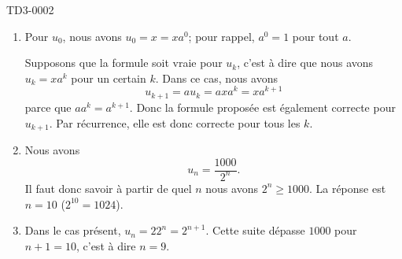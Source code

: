 
\begin{corrige}{TD3-0002}

	\begin{enumerate}
		\item
			Pour $u_0$, nous avons $u_0=x=xa^0$; pour rappel, $a^0=1$ pour tout $a$.

			Supposons que la formule soit vraie pour $u_k$, c'est à dire que nous avons $u_k=xa^k$ pour un certain $k$. Dans ce cas, nous avons
			\begin{equation}
				u_{k+1}=au_{k}=axa^k=xa^{k+1}
			\end{equation}
			parce que $aa^k=a^{k+1}$. Donc la formule proposée est également correcte pour $u_{k+1}$. Par récurrence, elle est donc correcte pour tous les $k$.
		\item
			Nous avons
			\begin{equation}
				u_n=\frac{ 1000 }{ 2^n }.
			\end{equation}
			Il faut donc savoir à partir de quel $n$ nous avons $2^n\geq 1000$. La réponse est $n=10$ ($2^{10}=1024$).
		\item
			Dans le cas présent, $u_n=22^n=2^{n+1}$. Cette suite dépasse $1000$ pour $n+1=10$, c'est à dire $n=9$.
	\end{enumerate}

\end{corrige}
